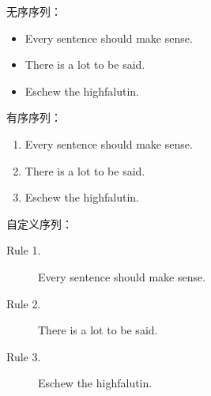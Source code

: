 \documentclass{article}
\begin{document}
	
	无序序列：	
	\begin{itemize}
		\item Every sentence should make sense.
		\item There is a lot to be said.
		\item Eschew the highfalutin.
	\end{itemize}
	
	有序序列：
	\begin{enumerate}
		\item Every sentence should make sense.
		\item There is a lot to be said.
		\item Eschew the highfalutin.
	\end{enumerate}
	
	
	自定义序列：
	
	\begin{description}
		\item[Rule 1.] Every sentence should make sense.
		\item[Rule 2.] There is a lot to be said.
		\item[Rule 3.] Eschew the highfalutin.
	\end{description}	
\end{document}
